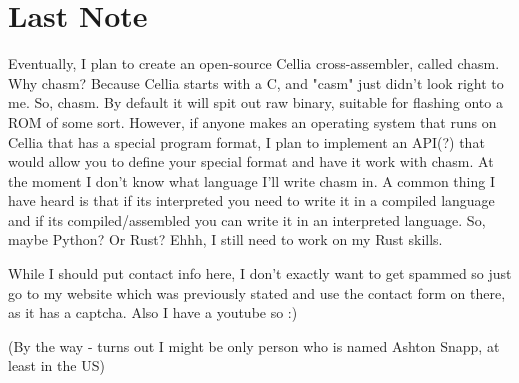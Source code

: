 \documentclass[letterpaper,12pt]{book}
\begin{document}
\backmatter

\chapter*{Last Note}

Eventually, I plan to create an open-source Cellia cross-assembler, called chasm. Why chasm? Because Cellia starts with a C, and "casm" just didn't look right to me. So, chasm. By default it will spit out raw binary, suitable for flashing onto a ROM of some sort. However, if anyone makes an operating system that runs on Cellia that has a special program format, I plan to implement an API(?) that would allow you to define your special format and have it work with chasm. At the moment I don't know what language I'll write chasm in. A common thing I have heard is that if its interpreted you need to write it in a compiled language and if its compiled/assembled you can write it in an interpreted language. So, maybe Python? Or Rust? Ehhh, I still need to work on my Rust skills.

While I should put contact info here, I don't exactly want to get spammed so just go to my website which was previously stated and use the contact form on there, as it has a captcha. Also I have a youtube so :)

(By the way - turns out I might be only person who is named Ashton Snapp, at least in the US)
\end{document}
